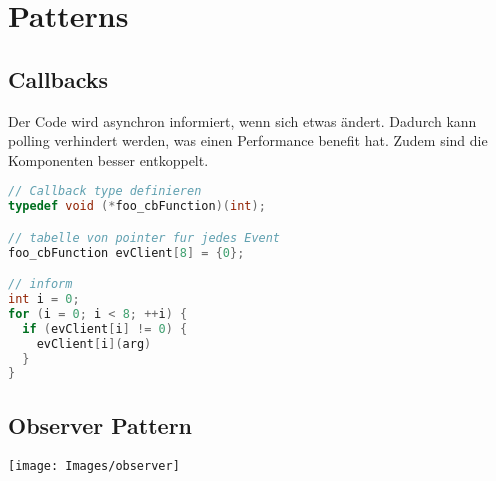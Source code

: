 \section{Patterns}
\subsection{Callbacks}
Der Code wird asynchron informiert, wenn sich etwas ändert. Dadurch kann polling verhindert werden, was einen Performance benefit hat. Zudem 
sind die Komponenten besser entkoppelt.
\begin{lstlisting}[language=c, style=cppstyle]
// Callback type definieren
typedef void (*foo_cbFunction)(int);

// tabelle von pointer fur jedes Event
foo_cbFunction evClient[8] = {0};

// inform
int i = 0;
for (i = 0; i < 8; ++i) {
  if (evClient[i] != 0) {
    evClient[i](arg)	
  }
}
\end{lstlisting}

\subsection{Observer Pattern}
\begin{center}
	\texttt{[image: Images/observer]}
\end{center}
